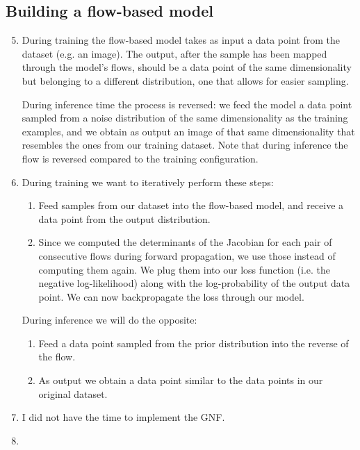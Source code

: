 \documentclass{article}
\begin{document}
\subsection{Building a flow-based model}

\begin{enumerate}[label=\textbf{3.\arabic*}]
  \setcounter{enumi}{4}
  \item
  During training the flow-based model takes as input a data point from the dataset (e.g. an image). The output, after the sample has been mapped through the model's flows, should be a data point of the same dimensionality but belonging to a different distribution, one that allows for easier sampling.

  During inference time the process is reversed: we feed the model a data point sampled from a noise distribution of the same dimensionality as the training examples, and we obtain as output an image of that same dimensionality that resembles the ones from our training dataset. Note that during inference the flow is reversed compared to the training configuration.

  \item
  During training we want to iteratively perform these steps:

  \begin{enumerate}[label=\arabic*.]
    \item Feed samples from our dataset into the flow-based model, and receive a data point from the output distribution.

    \item Since we computed the determinants of the Jacobian for each pair of consecutive flows during forward propagation, we use those instead of computing them again. We plug them into our loss function (i.e. the negative log-likelihood) along with the log-probability of the output data point. We can now backpropagate the loss through our model.
  \end{enumerate}

  During inference we will do the opposite:

  \begin{enumerate}[label=\arabic*.]
    \item Feed a data point sampled from the prior distribution into the reverse of the flow.

    \item As output we obtain a data point similar to the data points in our original dataset.
  \end{enumerate}

  \item
  I did not have the time to implement the GNF.

  \item
\end{enumerate}
\end{document}
